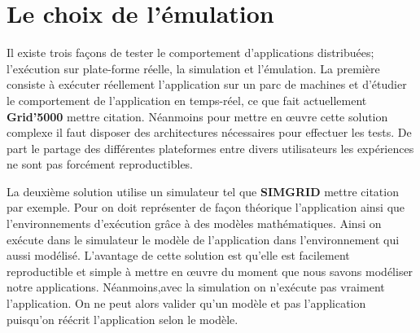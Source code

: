 \section{Le choix de l'émulation}

Il existe trois façons de tester le comportement d'applications distribuées; l'exécution sur plate-forme réelle, la simulation et l'émulation. La première consiste à exécuter réellement l'application sur un parc de machines et d'étudier le comportement de l'application en temps-réel, ce que fait actuellement \textbf{Grid'5000} {\color{red}mettre citation}. Néanmoins pour mettre en \oe uvre cette solution complexe il faut disposer des architectures nécessaires pour effectuer les tests. De part le partage des différentes plateformes entre divers utilisateurs les expériences ne sont pas forcément reproductibles. 

La deuxième solution utilise un simulateur tel que \textbf{SIMGRID} {\color{red}mettre citation} par exemple. Pour on doit représenter de façon théorique l'application ainsi que l'environnements d'exécution grâce à des modèles mathématiques. Ainsi on exécute dans le simulateur le modèle de l'application dans l'environnement qui aussi modélisé. L'avantage de cette solution est qu'elle est facilement reproductible et simple à mettre en \oe uvre du moment que nous savons modéliser notre applications. Néanmoins,avec la simulation on n'exécute pas vraiment l'application. On ne peut alors valider qu'un modèle et pas l'application puisqu'on réécrit l'application selon le modèle. 

